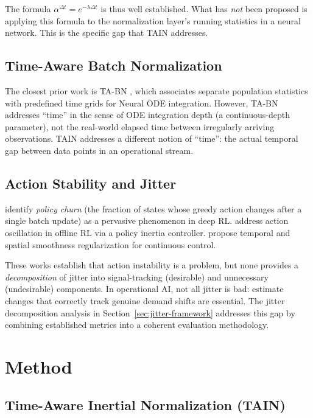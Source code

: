 \documentclass[11pt,a4paper]{article}
\begin{document}
The formula $\alpha^{\Delta t} = e^{-\lambda \Delta t}$ is thus well established.
What has \emph{not} been proposed is applying this formula to the normalization
layer's running statistics in a neural network. This is the specific gap that TAIN
addresses.

\subsection{Time-Aware Batch Normalization}

The closest prior work is TA-BN \citep{choi2024tabn}, which associates separate
population statistics with predefined time grids for Neural ODE integration.
However, TA-BN addresses ``time'' in the sense of ODE integration depth (a
continuous-depth parameter), not the real-world elapsed time between irregularly
arriving observations. TAIN addresses a different notion of ``time'': the
actual temporal gap between data points in an operational stream.

\subsection{Action Stability and Jitter}

\citet{schaul2022policy} identify \emph{policy churn} (the fraction of states
whose greedy action changes after a single batch update) as a pervasive
phenomenon in deep RL. \citet{chen2021action} address action oscillation in
offline RL via a policy inertia controller. \citet{mysore2021caps} propose
temporal and spatial smoothness regularization for continuous control.

These works establish that action instability is a problem, but none provides
a \emph{decomposition} of jitter into signal-tracking (desirable) and
unnecessary (undesirable) components. In operational AI, not all jitter is bad:
estimate changes that correctly track genuine demand shifts are essential.
The jitter decomposition analysis in Section~\ref{sec:jitter-framework}
addresses this gap by combining established metrics into a coherent evaluation
methodology.

\section{Method}

\subsection{Time-Aware Inertial Normalization (TAIN)}
\end{document}
